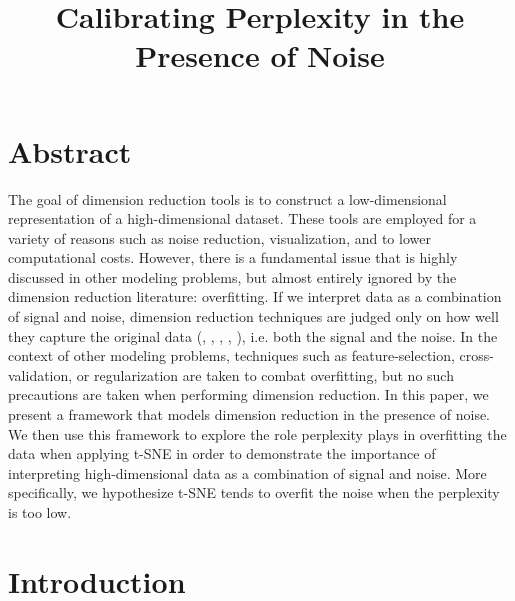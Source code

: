 \documentclass{article}
\title{Calibrating Perplexity in the Presence of Noise}
\date{}
\begin{document}
\maketitle

\section{Abstract}
The goal of dimension reduction tools is to construct a low-dimensional representation of a high-dimensional dataset. These tools are employed for a variety of reasons such as noise reduction, visualization, and to lower computational costs. However, there is a fundamental issue that is highly discussed in other modeling problems, but almost entirely ignored by the dimension reduction literature: overfitting. If we interpret data as a combination of signal and noise, dimension reduction techniques are judged only on how well they capture the original data (\cite{perplexity vs kl}, \cite{quantitative survey}, \cite{t-SNE cell}, \cite{rank-based criteria}, \cite{precision score}), i.e. both the signal and the noise. In the context of other modeling problems, techniques such as feature-selection, cross-validation, or regularization are taken to combat overfitting, but no such precautions are taken when performing dimension reduction. In this paper, we present a framework that models dimension reduction in the presence of noise. We then use this framework to explore the role perplexity plays in overfitting the data when applying t-SNE in order to demonstrate the importance of interpreting high-dimensional data as a combination of signal and noise. More specifically, we hypothesize t-SNE tends to overfit the noise when the perplexity is too low.

\section{Introduction}
\end{document}
